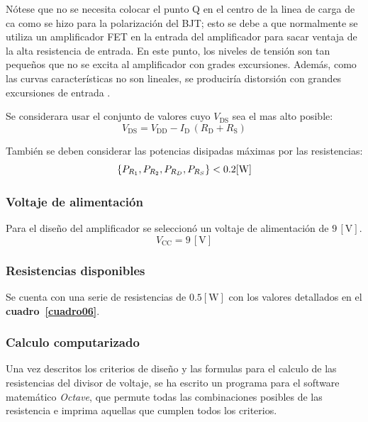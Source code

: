 Nótese que no se necesita colocar el punto Q en el centro de la linea de carga
de ca como se hizo para la polarización del BJT; esto se debe a que normalmente
se utiliza un amplificador FET en la entrada del amplificador para sacar ventaja
de la alta resistencia de entrada. En este punto, los niveles de tensión son tan
pequeños que no se excita al amplificador con grades excursiones. Además, como
las curvas características no son lineales, se produciría distorsión con grandes
excursiones de entrada \cite{Savant}.

Se considerara usar el conjunto de valores cuyo $V_{\text{DS}}$ sea el mas alto
posible:
\begin{equation*}
    V_{\text{DS}} = V_{\text{DD}} - I_{\text{D}}\,(R_{\text{D}} + R_{\text{S}})
\end{equation*}

También se deben considerar las potencias disipadas máximas por las
resistencias:
\begin{equation*}
    \{P_{R_1}, P_{R_2}, P_{R_D}, P_{R_S}\} < 0.2[\text{W}]\\
\end{equation*}

\subsubsection{Voltaje de alimentación}
Para el diseño del amplificador se seleccionó un voltaje de alimentación de
$9\,[\text{V}]$.
\begin{equation*}
    V_{\text{CC}} = 9\,[\text{V}]
\end{equation*}

\subsubsection{Resistencias disponibles}
Se cuenta con una serie de resistencias de $0.5[\text{W}]$ con los valores
detallados en el \textbf{cuadro~\ref{cuadro06}}.

\subsubsection{Calculo computarizado}
Una vez descritos los criterios de diseño y las formulas para el calculo de las
resistencias del divisor de voltaje, se ha escrito un programa para el software
matemático \emph{Octave}, que permute todas las combinaciones posibles de las 
resistencia e imprima aquellas que cumplen todos los criterios.


